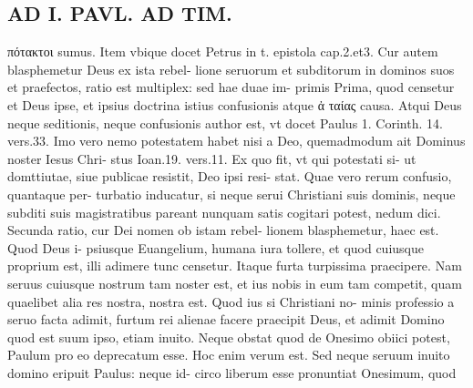 \documentclass{article}
\begin{document}
\begin{pages}
\section*{AD I. PAVL. AD TIM. }
\marginpar{[ p.416 ]}\pstart πότακτοι sumus. Item vbique docet Petrus in t. epistola cap.2.et3.  \pend\pstart Cur autem blasphemetur Deus ex ista rebel- lione seruorum et subditorum in dominos suos et praefectos, ratio est multiplex: sed hae duae im- primis  \pend\pstart Prima, quod censetur et Deus ipse, et ipsius doctrina istius confusionis atque ἀ ταίας causa. Atqui Deus neque seditionis, neque confusionis author est, vt docet Paulus 1. Corinth. 14. vers.33. Imo vero nemo potestatem habet nisi a Deo, quemadmodum ait Dominus noster Iesus Chri- stus Ioan.19. vers.11. Ex quo fit, vt qui potestati si- ut domttiutae, siue publicae resistit, Deo ipsi resi- stat. Quae vero rerum confusio, quantaque per- turbatio inducatur, si neque serui Christiani suis dominis, neque subditi suis magistratibus pareant nunquam satis cogitari potest, nedum dici.  \pend\pstart Secunda ratio, cur Dei nomen ob istam rebel- lionem blasphemetur, haec est. Quod Deus i- psiusque Euangelium, humana iura tollere, et quod cuiusque proprium est, illi adimere tunc censetur. Itaque furta turpissima praecipere. Nam seruus cuiusque nostrum tam noster est, et ius nobis in eum tam competit, quam quaelibet alia res nostra, nostra est. Quod ius si Christiani no- minis professio a seruo facta adimit, furtum rei alienae facere praecipit Deus, et adimit Domino quod est suum ipso, etiam inuito. Neque obstat quod de Onesimo obiici potest, Paulum pro eo deprecatum esse. Hoc enim verum est. Sed neque  seruum inuito domino eripuit Paulus: neque id- circo liberum esse pronuntiat Onesimum, quod  \pend

\end{pages}
\end{document}
